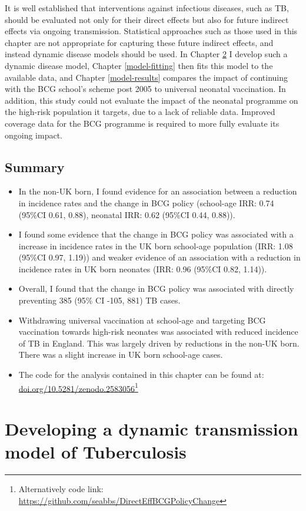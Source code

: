 \documentclass[11pt,twoside]{bristolthesis}
\begin{document}
  It is well established that interventions against infectious diseases, such as TB, should be evaluated not only for their direct effects but also for future indirect effects via ongoing transmission. Statistical approaches such as those used in this chapter are not appropriate for capturing these future indirect effects, and instead dynamic disease models should be used. In Chapter \ref{model-development} I develop such a dynamic disease model, Chapter \ref{model-fitting} then fits this model to the available data, and Chapter \ref{model-results} compares the impact of continuing with the BCG school's scheme post 2005 to universal neonatal vaccination. In addition, this study could not evaluate the impact of the neonatal programme on the high-risk population it targets, due to a lack of reliable data. Improved coverage data for the BCG programme is required to more fully evaluate its ongoing impact.
  
  \hypertarget{summary-6}{%
  \section{Summary}\label{summary-6}}
  \begin{itemize}
  \item
    In the non-UK born, I found evidence for an association between a reduction in incidence rates and the change in BCG policy (school-age IRR: 0.74 (95\%CI 0.61, 0.88), neonatal IRR: 0.62 (95\%CI 0.44, 0.88)).
  \item
    I found some evidence that the change in BCG policy was associated with a increase in incidence rates in the UK born school-age population (IRR: 1.08 (95\%CI 0.97, 1.19)) and weaker evidence of an association with a reduction in incidence rates in UK born neonates (IRR: 0.96 (95\%CI 0.82, 1.14)).
  \item
    Overall, I found that the change in BCG policy was associated with directly preventing 385 (95\% CI -105, 881) TB cases.
  \item
    Withdrawing universal vaccination at school-age and targeting BCG vaccination towards high-risk neonates was associated with reduced incidence of TB in England. This was largely driven by reductions in the non-UK born. There was a slight increase in UK born school-age cases.
  \item
    The code for the analysis contained in this chapter can be found at: \url{doi.org/10.5281/zenodo.2583056}\footnote{Alternatively code link: \url{https://github.com/seabbs/DirectEffBCGPolicyChange}}
  \end{itemize}
  \hypertarget{model-development}{%
  \chapter{Developing a dynamic transmission model of Tuberculosis}\label{model-development}}
  
\end{document}
